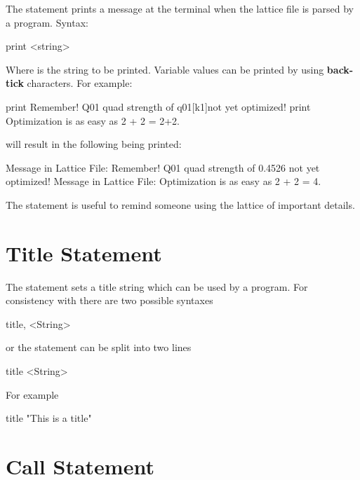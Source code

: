 {{{{{The  statement prints a message at the terminal when the 
lattice file is parsed by a program. Syntax:
\begin{example}
  print <string>
\end{example}
Where  is the string to be printed. Variable values can be printed by using
\textbf{back-tick} characters. For example:
\begin{example}
  print Remember! Q01 quad strength of \backtick{}q01[k1]\backtick not yet optimized!
  print Optimization is as easy as 2 + 2 = \backtick{}2+2\backtick.
\end{example}
will result in the following being printed:
\begin{example}
  Message in Lattice File: Remember! Q01 quad strength of 0.4526 not yet optimized!
  Message in Lattice File: Optimization is as easy as 2 + 2 = 4.
\end{example}

The  statement is useful to remind someone using the lattice of important details.

\section{Title Statement}

The  statement sets a title string which can be used by a program.  For consistency with
\mad there are two possible syntaxes
\begin{example}
  title, <String>
\end{example}
or the statement can be split into two lines
\begin{example}
  title
  <String>
\end{example}
For example
\begin{example}
  title
  "This is a title"
\end{example}

\section{Call Statement}
\label{s:call}

}}}}}
